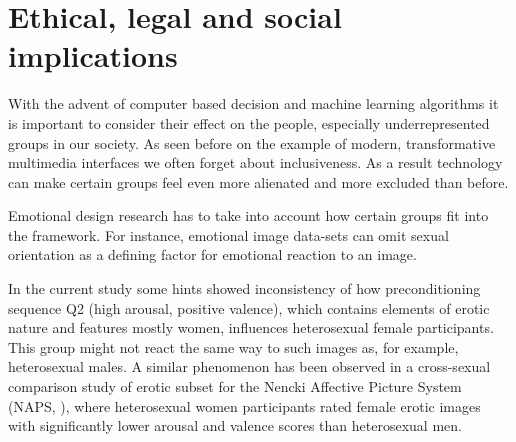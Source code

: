 \section{Ethical, legal and social implications}







With the advent of computer based decision and machine learning algorithms it is important to consider their effect on the people, especially underrepresented groups in our society. As seen before on the example of modern, transformative multimedia interfaces we often forget about inclusiveness. As a result technology can make certain groups feel even more alienated and more excluded than before.

Emotional design research has to take into account how certain groups fit into the framework. For instance, emotional image data-sets can omit sexual orientation as a defining factor for emotional reaction to an image.

In the current study some hints showed inconsistency of how preconditioning sequence Q2 (high arousal, positive valence), which contains elements of erotic nature and features mostly women, influences heterosexual female participants. 
This group might not react the same way to such images as, for example, heterosexual males. A similar phenomenon has been observed in a cross-sexual comparison study of erotic subset for the Nencki Affective Picture System (NAPS, \cite{Wierzba2015}), where heterosexual women participants rated female erotic images with significantly lower arousal and valence scores than heterosexual men.

